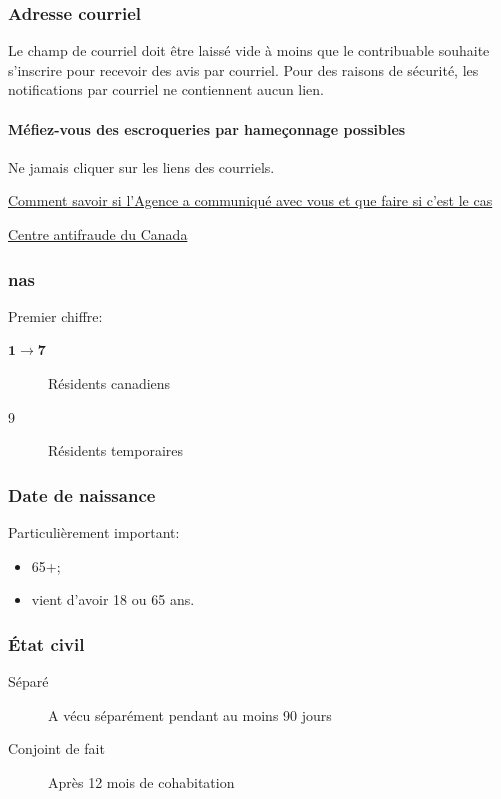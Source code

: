 \subsubsection{Adresse courriel}
Le champ de courriel doit être laissé vide à moins que le contribuable souhaite s'inscrire pour recevoir des avis par courriel. Pour des raisons de sécurité, les notifications par courriel ne contiennent aucun lien.
\paragraph{Méfiez-vous des escroqueries par hameçonnage possibles}

Ne jamais cliquer sur les liens des courriels.

\cat\href{https://www.canada.ca/fr/agence-revenu/nouvelles/salle-presse/conseils-fiscaux/conseils-fiscaux-2021/comment-savoir-si-lagence-a-communique-avec-vous-et-que-faire-si-cest-le-cas.html}{Comment savoir si l'Agence a communiqué avec vous et que faire si c'est le cas}

\cat\href{https://antifraudcentre-centreantifraude.ca/}{Centre antifraude du Canada}

\subsubsection{\acrfull{nas}}
Premier chiffre:
\begin{description}
	\item[$\boldsymbol{1 \rightarrow 7}$] Résidents canadiens
	\item[9] Résidents temporaires
\end{description}

\subsubsection{Date de naissance}
Particulièrement important:
\begin{itemize}
	\item 65+;
	\item vient d'avoir 18 ou 65 ans.
\end{itemize}

\subsubsection{État civil}
\begin{description}
	\item[Séparé] A vécu séparément pendant au moins 90 jours
	\item[Conjoint de fait] Après 12 mois de cohabitation
\end{description}

